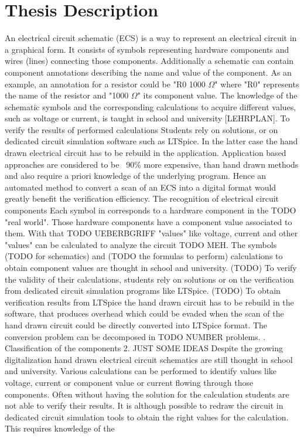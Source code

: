 \documentclass{article}%
\begin{document}
\section*{Thesis Description}
An electrical circuit schematic (ECS) is a way to represent an electrical circuit in a graphical form. It consists of symbols representing hardware components and wires (lines) connecting those components. Additionally a schematic can contain component annotations describing the name and value of the component. As an example, an annotation for a resistor could be "R0 1000 $\Omega$" where "R0" represents the name of the resistor and "1000 $\Omega$" its component value.
\lf
The knowledge of the schematic symbols and the corresponding calculations to acquire different values, such as voltage or current, is taught in school and university [LEHRPLAN]. To verify the results of performed calculations Students rely on solutions, or on dedicated circuit simulation software such as LTSpice. In the latter case the hand drawn electrical circuit has to be rebuild in the application. Application based approaches are considered to be ~90\% more expensive, than hand drawn methods \cite{ctxindependentsvm} and also require a priori knowledge of the underlying program. Hence an automated method to convert a scan of an ECS into a digital format would greatly benefit the verification efficiency.
\lf
The recognition of electrical circuit components
\lf
Each symbol in corresponds to a hardware component in the TODO "real world". Those hardware components have a component value associated to them. With that TODO UEBERBGRIFF "values" like voltage, current and other "values" can be calculated to analyze the circuit TODO MEH. The symbols (TODO for schematics) and (TODO the formulas to perform) calculations to obtain component values are thought in school and university. (TODO) To verify the validity of their calculations, students rely on solutions or on the verification from dedicated circuit simulation programs like LTSpice. (TODO) To obtain verification results from LTSpice the hand drawn circuit has to be rebuild in the software, that produces overhead which could be evaded when the scan of the hand drawn circuit could be directly converted into LTSpice format.
\lf
The conversion problem can be decomposed in TODO NUMBER problems.
. Classification of the components
2.
\lf
JUST SOME IDEAS
\lf
Despite the growing digitalization hand drawn electrical circuit schematics are still thought in school and university. Various calculations can be performed to identify values like voltage, current or component value or current flowing through those components. Often without having the solution for the calculation students are not able to verify their results. It is although possible to redraw the circuit in dedicated circuit simulation tools to obtain the right values for the calculation. This requires knowledge of the
\end{document}
